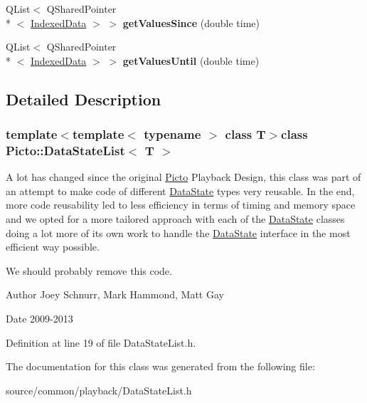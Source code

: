 \begin{DoxyCompactItemize}
\item 
\hypertarget{class_picto_1_1_data_state_list_a4be659f33938d15859906afc50d5195d}{Q\-List$<$ Q\-Shared\-Pointer\\*
$<$ \hyperlink{struct_picto_1_1_indexed_data}{Indexed\-Data} $>$ $>$ {\bfseries get\-Values\-Since} (double time)}\label{class_picto_1_1_data_state_list_a4be659f33938d15859906afc50d5195d}

\item 
\hypertarget{class_picto_1_1_data_state_list_a8d33dd9c9d20df3406ac31ef45053544}{Q\-List$<$ Q\-Shared\-Pointer\\*
$<$ \hyperlink{struct_picto_1_1_indexed_data}{Indexed\-Data} $>$ $>$ {\bfseries get\-Values\-Until} (double time)}\label{class_picto_1_1_data_state_list_a8d33dd9c9d20df3406ac31ef45053544}

\end{DoxyCompactItemize}


\subsection{Detailed Description}
\subsubsection*{template$<$template$<$ typename $>$ class T$>$class Picto\-::\-Data\-State\-List$<$ T $>$}

A lot has changed since the original \hyperlink{namespace_picto}{Picto} Playback Design, this class was part of an attempt to make code of different \hyperlink{class_picto_1_1_data_state}{Data\-State} types very reusable. In the end, more code reusability led to less efficiency in terms of timing and memory space and we opted for a more tailored approach with each of the \hyperlink{class_picto_1_1_data_state}{Data\-State} classes doing a lot more of its own work to handle the \hyperlink{class_picto_1_1_data_state}{Data\-State} interface in the most efficient way possible. 

We should probably remove this code. \begin{DoxyAuthor}{Author}
Joey Schnurr, Mark Hammond, Matt Gay 
\end{DoxyAuthor}
\begin{DoxyDate}{Date}
2009-\/2013 
\end{DoxyDate}


Definition at line 19 of file Data\-State\-List.\-h.



The documentation for this class was generated from the following file\-:\begin{DoxyCompactItemize}
\item 
source/common/playback/Data\-State\-List.\-h\end{DoxyCompactItemize}
